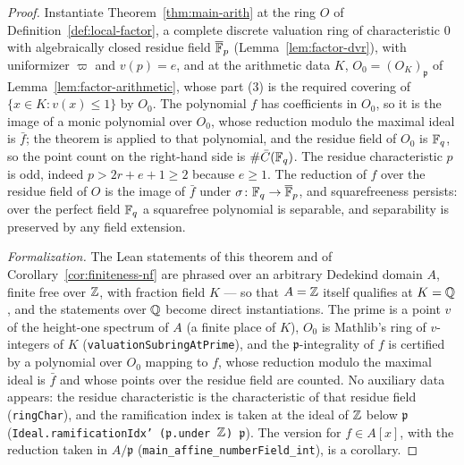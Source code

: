 \begin{proof}
\leanok
Instantiate Theorem~\ref{thm:main-arith} at the ring $O$ of
Definition~\ref{def:local-factor}, a complete discrete valuation ring of characteristic
$0$ with algebraically closed residue field $\overline{\mathbb{F}}_p$ (Lemma~\ref{lem:factor-dvr}), with
uniformizer $\varpi$ and $v(p) = e$, and at the arithmetic data $K$,
$O_0 = (O_K)_{\mathfrak p}$ of Lemma~\ref{lem:factor-arithmetic}, whose part (3) is the
required covering of $\{x \in K : v(x) \le 1\}$ by $O_0$. The polynomial $f$ has
coefficients in $O_0$, so it is the image of a monic polynomial over $O_0$, whose reduction
modulo the maximal ideal is $\bar f$; the theorem is applied to that polynomial, and the
residue field of $O_0$ is $\mathbb{F}_q$, so the point count on the right-hand side is
$\#\bar C(\mathbb{F}_q)$. The residue characteristic $p$ is odd, indeed $p > 2r + e + 1 \ge 2$
because $e \ge 1$. The reduction of $f$ over the residue field of $O$ is the image of
$\bar f$ under $\sigma \colon \mathbb{F}_q \to \overline{\mathbb{F}}_p$, and squarefreeness persists: over the
perfect field $\mathbb{F}_q$ a squarefree polynomial is separable, and separability is preserved
by any field extension.

\emph{Formalization.} The Lean statements of this theorem and of
Corollary~\ref{cor:finiteness-nf} are phrased over an arbitrary Dedekind domain $A$,
finite free over $\mathbb{Z}$, with fraction field $K$ --- so that $A = \mathbb{Z}$ itself qualifies at
$K = \mathbb{Q}$, and the statements over $\mathbb{Q}$ become direct instantiations. The prime is a
point $v$ of the height-one spectrum of $A$ (a finite place of $K$), $O_0$ is Mathlib's
ring of $v$-integers of $K$ (\texttt{valuationSubringAtPrime}), and the
$\mathfrak p$-integrality of $f$ is certified by a polynomial over $O_0$ mapping to $f$,
whose reduction modulo the maximal ideal is $\bar f$ and whose points over the residue
field are counted. No auxiliary data appears: the residue characteristic is the
characteristic of that residue field (\texttt{ringChar}), and the ramification index is
taken at the ideal of $\mathbb{Z}$ below $\mathfrak p$ (\texttt{Ideal.ramificationIdx'
($\mathfrak p$.under $\mathbb{Z}$) $\mathfrak p$}). The version for $f \in A[x]$, with the
reduction taken in $A/\mathfrak p$ (\texttt{main\_affine\_numberField\_int}), is a
corollary.
\end{proof}

